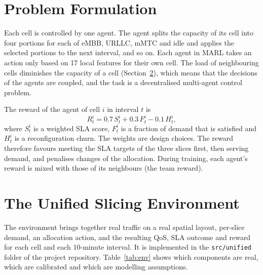  
\section{Problem Formulation}
Each cell is controlled by one agent. The agent splits the capacity of its cell into four portions for each of eMBB, URLLC, mMTC and idle and applies the selected portions to the next interval, and so on. Each agent in MARL takes an action only based on 17 local features for their own cell. The load of neighbouring cells diminishes the capacity of a cell (Section~\ref{sec:env}), which means that the decisions of the agents are coupled, and the task is a decentralised multi-agent control problem.

The reward of the agent of cell $i$ in interval $t$ is
\begin{equation}
R_t^{i} = 0.7\,S_t^{i} + 0.3\,F_t^{i} - 0.1\,H_t^{i},
\label{eq:reward}
\end{equation}
where $S_t^{i}$ is a weighted SLA score, $F_t^{i}$ is a fraction of demand that is satisfied and $H_t^{i}$ is a reconfiguration churn. The weights are design choices. The reward therefore favours meeting the SLA targets of the three slices first, then serving demand, and penalises changes of the allocation. During training, each agent's reward is mixed with those of its neighbours (the team reward).

\section{The Unified Slicing Environment}
\label{sec:env}
The environment brings together real traffic on a real spatial layout, per-slice demand, an allocation action, and the resulting QoS, SLA outcome and reward for each cell and each 10-minute interval. It is implemented in the \texttt{src/unified} folder of the project repository. Table~\ref{tab:env} shows which components are real, which are calibrated and which are modelling assumptions.



